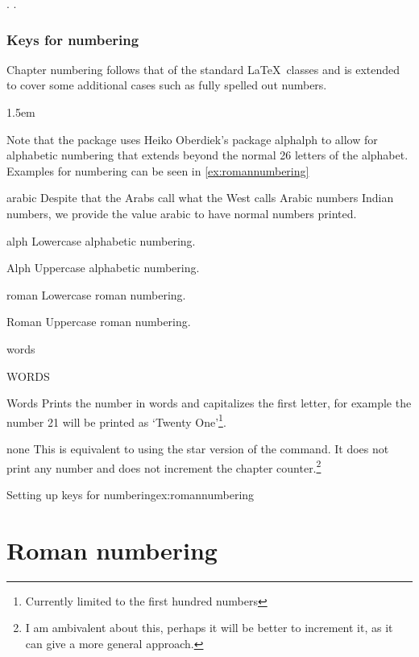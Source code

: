\medskip

.
.

\subsection{Keys for numbering}
Chapter numbering follows that of the standard \LaTeX\ classes and is extended to cover some additional cases such as fully spelled out numbers.

\medskip

\parindent1.5em

Note that the package uses Heiko Oberdiek's package alphalph to allow for alphabetic numbering that extends beyond the normal 26 letters of the alphabet. Examples for numbering can be seen in \ref{ex:romannumbering}

\medskip




\begin{marglist}
\item [arabic] Despite that the Arabs call what the West calls Arabic numbers Indian numbers, we provide the value arabic to have normal numbers printed.
\item [alph] Lowercase alphabetic numbering.
\item [Alph] Uppercase alphabetic numbering.
\item [roman] Lowercase roman numbering.
\item [Roman] Uppercase roman numbering.
\item [words]
\item [WORDS]
\item [Words] Prints the number in words and capitalizes the first letter, for example the number 21 will be printed as `Twenty One'\footnote{Currently limited to the first hundred numbers}.
\item [none] This is equivalent to using the star version of the command. It does not print any number and does not increment the chapter counter.\footnote{I am ambivalent about this, perhaps it will be better to increment it, as it can give a more general approach.}
\end{marglist}

\begin{texexample}{Setting up keys for numbering}{ex:romannumbering}
\chapter{Roman numbering}
\end{texexample}




